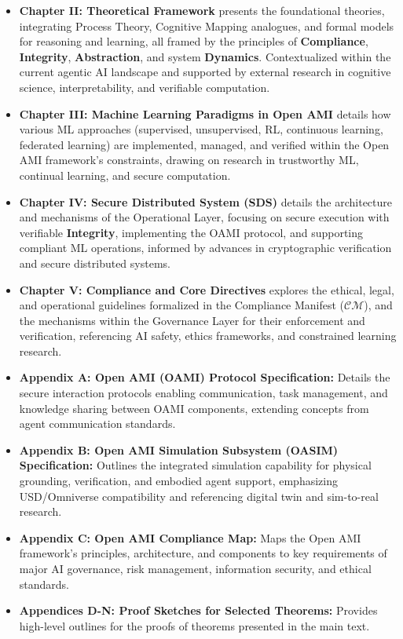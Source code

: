 \documentclass[12pt,a4paper]{report}
\newcommand{\Compliance}{\textbf{Compliance}}
\newcommand{\Integrity}{\textbf{Integrity}}
\newcommand{\Abstraction}{\textbf{Abstraction}}
\newcommand{\Dynamics}{\textbf{Dynamics}}
\begin{document}
	\begin{itemize}[leftmargin=*]
		\item \textbf{Chapter II: Theoretical Framework} presents the foundational theories, integrating Process Theory, Cognitive Mapping analogues, and formal models for reasoning and learning, all framed by the principles of \Compliance, \Integrity, \Abstraction, and system \Dynamics. Contextualized within the current agentic AI landscape and supported by external research in cognitive science, interpretability, and verifiable computation.
		\item \textbf{Chapter III: Machine Learning Paradigms in Open AMI} details how various ML approaches (supervised, unsupervised, RL, continuous learning, federated learning) are implemented, managed, and verified within the Open AMI framework's constraints, drawing on research in trustworthy ML, continual learning, and secure computation.
		\item \textbf{Chapter IV: Secure Distributed System (SDS)} details the architecture and mechanisms of the Operational Layer, focusing on secure execution with verifiable \Integrity, implementing the OAMI protocol, and supporting compliant ML operations, informed by advances in cryptographic verification and secure distributed systems.
		\item \textbf{Chapter V: Compliance and Core Directives} explores the ethical, legal, and operational guidelines formalized in the Compliance Manifest ($\mathcal{CM}$), and the mechanisms within the Governance Layer for their enforcement and verification, referencing AI safety, ethics frameworks, and constrained learning research.
		\item \textbf{Appendix A: Open AMI (OAMI) Protocol Specification:} Details the secure interaction protocols enabling communication, task management, and knowledge sharing between OAMI components, extending concepts from agent communication standards.
		\item \textbf{Appendix B: Open AMI Simulation Subsystem (OASIM) Specification:} Outlines the integrated simulation capability for physical grounding, verification, and embodied agent support, emphasizing USD/Omniverse compatibility and referencing digital twin and sim-to-real research.
		\item \textbf{Appendix C: Open AMI Compliance Map:} Maps the Open AMI framework's principles, architecture, and components to key requirements of major AI governance, risk management, information security, and ethical standards.
		\item \textbf{Appendices D-N: Proof Sketches for Selected Theorems:} Provides high-level outlines for the proofs of theorems presented in the main text.

\end{itemize}
\end{document}
